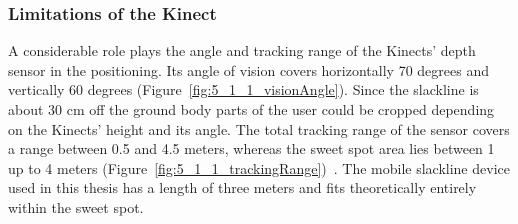 \subsubsection{Limitations of the Kinect} 
A considerable role plays the angle and tracking range of the Kinects' depth sensor in the positioning.
Its angle of vision covers horizontally 70 degrees and vertically 60 degrees (Figure~\ref{fig:5_1_1_visionAngle}).
Since the slackline is about 30 cm off the ground body parts of the user could be cropped depending on the Kinects' height and its angle.
The total tracking range of the sensor covers a range between 0.5 and 4.5 meters, whereas the sweet spot area lies between 1 up to 4 meters (Figure~\ref{fig:5_1_1_trackingRange})~\cite{MicrosoftHIG2014-mh}.
The mobile slackline device used in this thesis has a length of three meters and fits theoretically entirely within the sweet spot.
